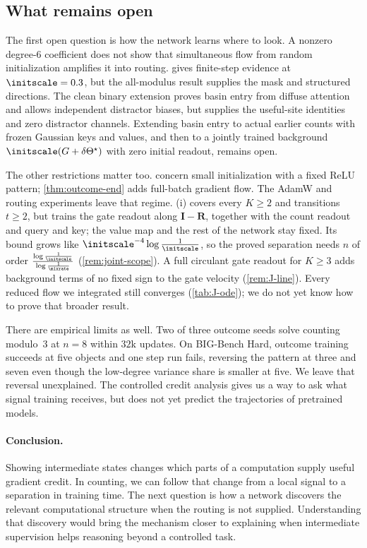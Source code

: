 \subsection{What remains open}
The first open question is how the network learns where to look. A nonzero degree-$6$ coefficient does not show that simultaneous
flow from random initialization amplifies it into routing.  gives finite-step evidence at $\initscale=0.3$, but the
all-modulus result supplies the mask and structured directions. The clean binary extension proves basin entry from diffuse
attention and allows independent distractor biases, but supplies the useful-site identities and zero distractor channels.
Extending basin entry to actual earlier counts with frozen Gaussian keys and values, and then to a jointly trained background
$\initscale(G+\delta\Theta^\star)$ with zero initial readout, remains open.

The other restrictions matter too.  concern small initialization with a fixed ReLU pattern;
\cref{thm:outcome-end} adds full-batch gradient flow. The AdamW and routing experiments leave that regime. (i) covers
every $K\ge2$ and transitions $t\ge2$, but trains the gate readout along $\mathbf I-\mathbf R$, together with the count readout and
query and key; the value map and the rest of the network stay fixed. Its bound grows like $\initscale^{-4}\log\frac{1}{\initscale}$,
so the proved separation needs $n$ of order $\frac{\log\frac{1}{\initscale}}{\log\frac{1}{\mixrate}}$ (\cref{rem:joint-scope}). A full
circulant gate readout for $K\ge3$ adds background terms of no fixed sign to the gate velocity (\cref{rem:J-line}). Every reduced
flow we integrated still converges (\cref{tab:J-ode}); we do not yet know how to prove that broader result.

There are empirical limits as well. Two of three outcome seeds solve counting modulo~$3$ at $n=8$ within $32$k updates.
On BIG-Bench Hard, outcome training succeeds at five objects and one step run fails, reversing the pattern at three and seven
even though the low-degree variance share is smaller at five. We leave that reversal unexplained. The controlled credit analysis
gives us a way to ask what signal training receives, but does not yet predict the trajectories of pretrained models.

\paragraph{Conclusion.} Showing intermediate states changes which parts of a computation supply useful gradient credit. In counting,
we can follow that change from a local signal to a separation in training time. The next question is how a network discovers the
relevant computational structure when the routing is not supplied. Understanding that discovery would bring the mechanism closer
to explaining when intermediate supervision helps reasoning beyond a controlled task.
